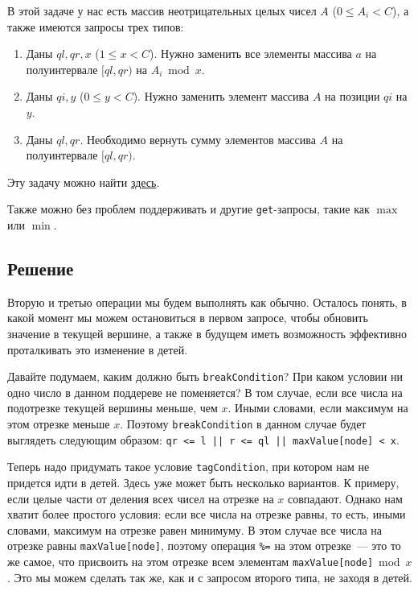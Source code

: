 В этой задаче у нас есть массив неотрицательных целых чисел $A$ ($0 \le A_i < C$), а также имеются запросы трех типов:

\begin{enumerate}
    \item Даны $ql, qr, x$ ($1 \le x < C$). Нужно заменить все элементы массива $a$ на полуинтервале $[ql, qr)$ на $A_i \bmod x$.
    \item Даны $qi, y$ ($0 \le y < C$). Нужно заменить элемент массива $A$ на позиции $qi$ на $y$.
    \item Даны $ql, qr$. Необходимо вернуть сумму элементов массива $A$ на полуинтервале $[ql, qr)$.
\end{enumerate}

Эту задачу можно найти \href{https://codeforces.com/contest/438/problem/D}{здесь}.

Также можно без проблем поддерживать и другие \verb+get+-запросы, такие как $\max$ или $\min$.

\subsection{Решение}

Вторую и третью операции мы будем выполнять как обычно. Осталось понять, в какой момент мы можем остановиться в первом запросе, чтобы обновить значение в текущей вершине, а также в будущем иметь возможность эффективно проталкивать это изменение в детей.

Давайте подумаем, каким должно быть \verb+breakCondition+? При каком условии ни одно число в данном поддереве не поменяется? В том случае, если все числа на подотрезке текущей вершины меньше, чем $x$. Иными словами, если максимум на этом отрезке меньше $x$. Поэтому \verb+breakCondition+ в данном случае будет выглядеть следующим образом: \verb+qr <= l || r <= ql || maxValue[node] < x+.

Теперь надо придумать такое условие \verb+tagCondition+, при котором нам не придется идти в детей. Здесь уже может быть несколько вариантов. К примеру, если целые части от деления всех чисел на отрезке на $x$ совпадают. Однако нам хватит более простого условия: если все числа на отрезке равны, то есть, иными словами, максимум на отрезке равен минимуму. В этом случае все числа на отрезке равны \verb+maxValue[node]+, поэтому операция \verb+%=+ на этом отрезке~--- это то же самое, что присвоить на этом отрезке всем элементам \verb+maxValue[node]+$\bmod x$. Это мы можем сделать так же, как и с запросом второго типа, не заходя в детей.

